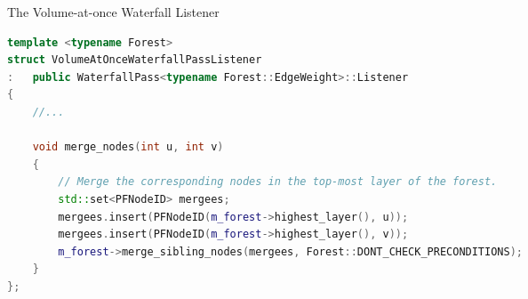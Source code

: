 \begin{stulisting}[p]
\caption{The Volume-at-once Waterfall Listener}
\label{code:segmentation-ipfconstruction-volumeatonce-waterfalllistener}
\begin{lstlisting}[style=Default,language=C++]
template <typename Forest>
struct VolumeAtOnceWaterfallPassListener
:	public WaterfallPass<typename Forest::EdgeWeight>::Listener
{
	//...

	void merge_nodes(int u, int v)
	{
		// Merge the corresponding nodes in the top-most layer of the forest.
		std::set<PFNodeID> mergees;
		mergees.insert(PFNodeID(m_forest->highest_layer(), u));
		mergees.insert(PFNodeID(m_forest->highest_layer(), v));
		m_forest->merge_sibling_nodes(mergees, Forest::DONT_CHECK_PRECONDITIONS);
	}
};
\end{lstlisting}
\end{stulisting}

